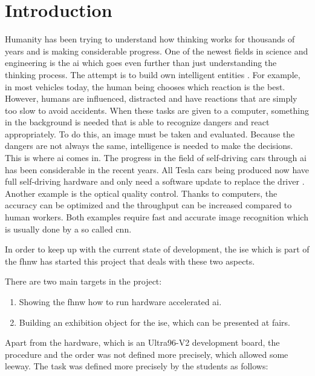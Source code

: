 \chapter*{Introduction}
\label{ch:introduction}

Humanity has been trying to understand how thinking works for thousands of years and is making considerable progress.
One of the newest fields in science and engineering is the \acrfull{ai} which goes even further than just understanding the thinking process.
The attempt is to build own intelligent entities \cite{ai}.
For example, in most vehicles today, the human being chooses which reaction is the best.
However, humans are influenced, distracted and have reactions that are simply too slow to avoid accidents.
When these tasks are given to a computer, something in the background is needed that is able to recognize dangers and react appropriately.
To do this, an image must be taken and evaluated.
Because the dangers are not always the same, intelligence is needed to make the decisions.
This is where \acrshort{ai} comes in.
The progress in the field of self-driving cars through \acrshort{ai} has been considerable in the recent years.
All Tesla cars being produced now have full self-driving hardware and only need a software update to replace the driver \cite{tesla_self_driving_cars}.
Another example is the optical quality control.
Thanks to computers, the accuracy can be optimized and the throughput can be increased compared to human workers.
Both examples require fast and accurate image recognition which is usually done by a so called \acrfull{cnn}. 

In order to keep up with the current state of development, the \acrfull{ise} which is part of the \acrfull{fhnw} has started this project that deals with these two aspects.

There are two main targets in the project:

\begin{enumerate}
	\item Showing the \acrshort{fhnw} how to run hardware accelerated \acrshort{ai}.
	\item Building an exhibition object for the \acrshort{ise}, which can be presented at fairs. 
\end{enumerate}

Apart from the hardware, which is an Ultra96-V2 development board, the procedure and the order was not defined more precisely, which allowed some leeway.
The task was defined more precisely by the students as follows:


